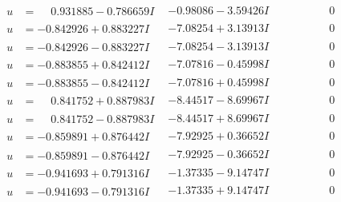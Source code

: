 \documentclass[1p]{elsarticle_modified}
\theoremstyle{definition}
\begin{document}
$$\begin{array}{c|c|c}
 \hline 
\begin{aligned}
u &= \phantom{-}0.931885 - 0.786659 I\end{aligned}
 & -0.98086 - 3.59426 I & \phantom{-0.000000 } 0 \\ \hline\begin{aligned}
u &= -0.842926 + 0.883227 I\end{aligned}
 & -7.08254 + 3.13913 I & \phantom{-0.000000 } 0 \\ \hline\begin{aligned}
u &= -0.842926 - 0.883227 I\end{aligned}
 & -7.08254 - 3.13913 I & \phantom{-0.000000 } 0 \\ \hline\begin{aligned}
u &= -0.883855 + 0.842412 I\end{aligned}
 & -7.07816 - 0.45998 I & \phantom{-0.000000 } 0 \\ \hline\begin{aligned}
u &= -0.883855 - 0.842412 I\end{aligned}
 & -7.07816 + 0.45998 I & \phantom{-0.000000 } 0 \\ \hline\begin{aligned}
u &= \phantom{-}0.841752 + 0.887983 I\end{aligned}
 & -8.44517 - 8.69967 I & \phantom{-0.000000 } 0 \\ \hline\begin{aligned}
u &= \phantom{-}0.841752 - 0.887983 I\end{aligned}
 & -8.44517 + 8.69967 I & \phantom{-0.000000 } 0 \\ \hline\begin{aligned}
u &= -0.859891 + 0.876442 I\end{aligned}
 & -7.92925 + 0.36652 I & \phantom{-0.000000 } 0 \\ \hline\begin{aligned}
u &= -0.859891 - 0.876442 I\end{aligned}
 & -7.92925 - 0.36652 I & \phantom{-0.000000 } 0 \\ \hline\begin{aligned}
u &= -0.941693 + 0.791316 I\end{aligned}
 & -1.37335 - 9.14747 I & \phantom{-0.000000 } 0 \\ \hline\begin{aligned}
u &= -0.941693 - 0.791316 I\end{aligned}
 & -1.37335 + 9.14747 I & \phantom{-0.000000 } 0 \\ \hline\begin{aligned}

\end{aligned}
\end{array}$$
\end{document}
